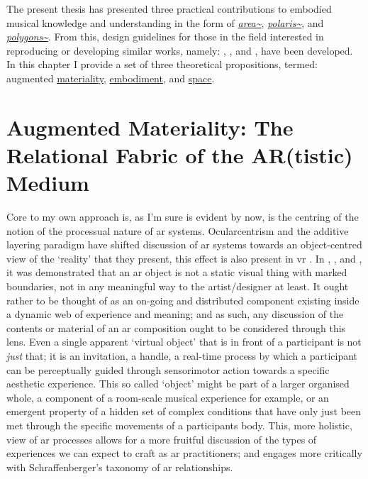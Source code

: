 The present thesis has presented three practical contributions to embodied musical knowledge and understanding in the form of \textit{\hyperref[sec: area]{area\textasciitilde{}}}, \textit{\hyperref[sec: polaris]{polaris\textasciitilde{}}}, and \textit{\hyperref[sec: polygons]{polygons\textasciitilde{}}}. From this, design guidelines for those in the field interested in reproducing or developing similar works, namely: \textit{}, \textit{}, and \textit{}, have been developed. In this chapter I provide a set of three theoretical propositions, termed: augmented \hyperref[sec: discussion-medium-material]{materiality}, \hyperref[sec: discussion-medium-embodiment]{embodiment}, and \hyperref[sec: discussion-medium-space]{space}.

\section[Augmented Materiality]{Augmented Materiality: The Relational Fabric of the AR(tistic) Medium}\label{sec: discussion-medium-material}
Core to my own approach is, as I'm sure is evident by now, is the centring of the notion of the processual nature of \gls{ar} systems. Ocularcentrism and the additive layering paradigm have shifted discussion of \gls{ar} systems towards an object-centred view of the `reality' that they present, this effect is also present in \gls{vr} \citep[]{hovhannisyan2019}. In \textit{}, \textit{}, and \textit{}, it was demonstrated that an \gls{ar} object is not a static visual thing with marked boundaries, not in any meaningful way to the artist/designer at least. It ought rather to be thought of as an on-going and distributed component existing inside a dynamic web of experience and meaning; and as such, any discussion of the contents or material of an \gls{ar} composition ought to be considered through this lens. Even a single apparent `virtual object' that is in front of a participant is not \textit{just} that; it is an invitation, a handle, a real-time process by which a participant can be perceptually guided through sensorimotor action towards a specific aesthetic experience. This so called `object' might be part of a larger organised whole, a component of a room-scale musical experience for example, or an emergent property of a hidden set of complex conditions that have only just been met through the specific movements of a participants body. This, more holistic, view of \gls{ar} processes allows for a more fruitful discussion of the types of experiences we can expect to craft as \gls{ar} practitioners; and engages more critically with Schraffenberger's taxonomy of \gls{ar} relationships.

